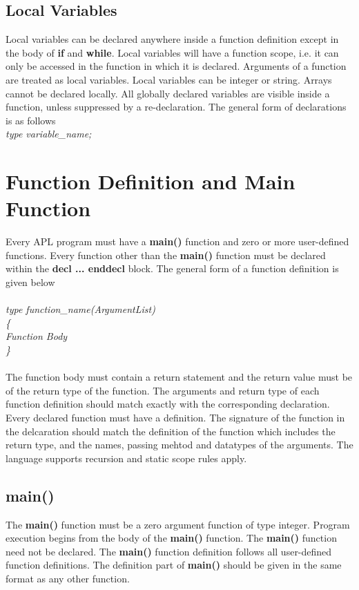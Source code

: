 \documentclass[11pt]{article}
\begin{document}
\subsection{Local Variables}
Local variables can be declared anywhere inside a function definition except in the body of \textbf{if} and \textbf{while}. Local variables will have a function scope, i.e. it can only be accessed in the function in which it is declared. Arguments of a function are treated as local variables. Local variables can be integer or string. Arrays cannot be declared locally. All globally declared variables are visible inside a function, unless suppressed by a re-declaration. The general form of declarations is as follows \\

\textit{type variable\_name;} 






\section{Function Definition and Main Function}

Every APL program must have a \textbf{main()} function and zero or more user-defined functions. Every function other than the \textbf{main()} function must be declared within the \textbf{decl ... enddecl} block. The general form of a function definition is given below 
\\
\\
\textit{
type function\_name(ArgumentList) \\ \{ \\
  Function Body \\
\}
}
\\
\\
The function body must contain a return statement and the return value must be of the return type of the function. The arguments and return type of each function definition should match exactly with the corresponding declaration. Every declared function must have a definition. The signature of the function in the delcaration should match the definition of the function which includes the return type, and the names, passing mehtod and datatypes of the arguments. The language supports recursion and static scope rules apply.




\subsection{main()}
The \textbf{main()} function must be a zero argument function of type integer. Program execution begins from the body of the \textbf{main()} function. The \textbf{main()} function need not be declared. The \textbf{main()} function definition follows all user-defined function definitions.  The definition part of \textbf{main()} should be given in the same format as any other function.
\end{document}
